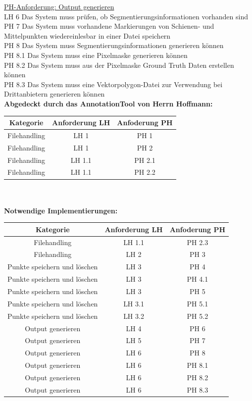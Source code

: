 \documentclass[11pt]{scrartcl}
\begin{document}
\noindent
\underline{PH-Anforderung: Output generieren}
\\
\noindent
LH 6  Das System muss prüfen, ob Segmentierungsinformationen vorhanden sind
\\
\noindent
PH 7 Das System muss vorhandene Markierungen von Schienen- und Mittelpunkten wiedereinlesbar in einer Datei speichern
\\
\noindent
PH 8   Das System muss Segmentierungsinformationen generieren können
\\
\noindent
PH 8.1  Das System muss eine Pixelmaske generieren können
\\
\noindent
PH 8.2 Das System muss aus der Pixelmaske Ground Truth Daten erstellen können
\\
\noindent
PH 8.3 Das System muss eine Vektorpolygon-Datei zur Verwendung bei Drittanbietern generieren können
\\

\noindent
\textbf{Abgedeckt durch das AnnotationTool von Herrn Hoffmann:}
\\


\noindent
\begin{tabular}[h]{c|c|c}
Kategorie & Anforderung LH & Anfoderung PH \\
\hline
Filehandling & LH 1 & PH 1 \\
Filehandling & LH 1 & PH 2 \\
Filehandling & LH 1.1 & PH 2.1 \\
Filehandling & LH 1.1 & PH 2.2 \\
\end{tabular}
\\
\\

\noindent
\textbf{Notwendige Implementierungen:}
\\


\noindent
\begin{tabular}[h]{c|c|c}
Kategorie & Anforderung LH & Anfoderung PH \\
\hline
Filehandling & LH 1.1 & PH 2.3\\
Filehandling & LH 2 & PH 3\\
Punkte speichern und löschen & LH 3 & PH 4 \\
Punkte speichern und löschen & LH 3 & PH 4.1 \\
Punkte speichern und löschen & LH 3 & PH 5 \\
Punkte speichern und löschen & LH 3.1 & PH 5.1 \\
Punkte speichern und löschen & LH 3.2 & PH 5.2 \\
Output generieren & LH 4 & PH 6 \\
Output generieren & LH 5 & PH 7 \\
Output generieren & LH 6 & PH 8 \\
Output generieren & LH 6 & PH 8.1 \\
Output generieren & LH 6 & PH 8.2 \\
Output generieren & LH 6 & PH 8.3 \\


\end{tabular}
\end{document}
